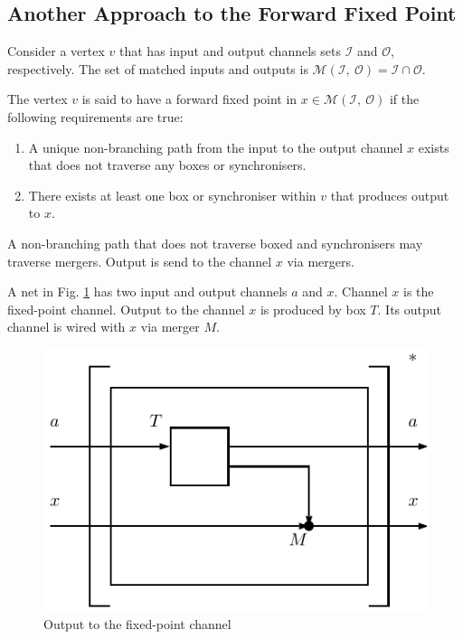     \subsection{Another Approach to the Forward Fixed Point\label{approach}}
Consider a vertex $v$ that has input and output channels sets $\mathcal{I}$ and $\mathcal{O}$, respectively. The set of matched inputs and outputs is $\mathcal{M}(\mathcal{I}, \: \mathcal{O}) = \mathcal{I} \cap \mathcal{O}$.

\begin{definition} The vertex $v$ is said to have a forward fixed point in $x \in \mathcal{M}(\mathcal{I}, \: \mathcal{O})$ if the following requirements are true:
    \begin{enumerate}
\item A unique non-branching path from the input to the output channel $x$ exists that does not traverse any boxes or synchronisers.
\item There exists at least one box or synchroniser within $v$ that produces output to $x$.
    \end{enumerate}
\end{definition}

A non-branching path that does not traverse boxed and synchronisers may traverse mergers. Output is send to the channel $x$ via mergers.

A net in Fig. \ref{fig:ffp_new} has two input and output channels $a$ and $x$. Channel $x$ is the fixed-point channel. Output to the channel $x$ is produced by box $T$. Its output channel is wired with $x$ via merger $M$.

  \begin{figure}[h!]
  \centering
  \includegraphics{figs/chapter_04_ffp_new.pdf}
  \caption{Output to the fixed-point channel}
  \label{fig:ffp_new}
  \end{figure}

